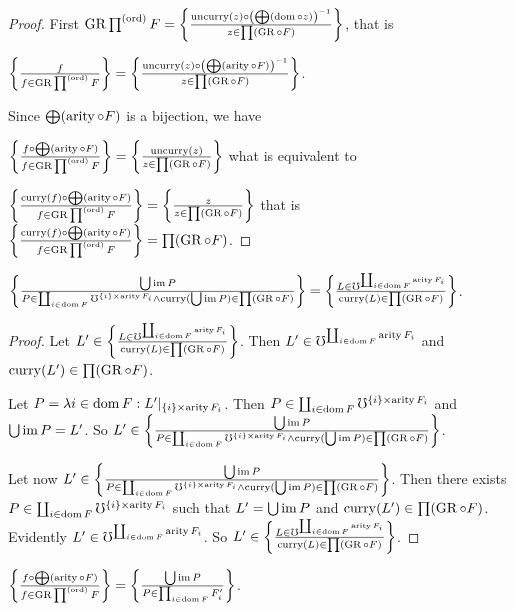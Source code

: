 \begin{proof}
First $\GR\prod^{\mathrm{(ord)}}F=\setcond{\uncurry(z)\circ\left(\bigoplus(\dom\circ z)\right)^{-1}}{z\in\prod(\GR\circ F)}$,
that is

$\setcond f{f\in\GR\prod^{\mathrm{(ord)}}F}=\setcond{\uncurry(z)\circ\left(\bigoplus(\arity\circ F)\right)^{-1}}{z\in\prod(\GR\circ F)}$.

Since $\bigoplus(\arity\circ F)$ is a bijection, we have

$\setcond{f\circ\bigoplus(\arity\circ F)}{f\in\GR\prod^{\mathrm{(ord)}}F}=\setcond{\uncurry(z)}{z\in\prod(\GR\circ F)}$
what is equivalent to

$\setcond{\curry(f)\circ\bigoplus(\arity\circ F)}{f\in\GR\prod^{\mathrm{(ord)}}F}=\setcond z{z\in\prod(\GR\circ F)}$
that is $\setcond{\curry(f)\circ\bigoplus(\arity\circ F)}{f\in\GR\prod^{\mathrm{(ord)}}F}=\prod(\GR\circ F)$.\end{proof}
\begin{lem}
$\setcond{\bigcup\im P}{P\in\coprod_{i\in\dom F}\mho^{\{i\}\times\arity F_{i}}\land\curry(\bigcup\im P)\in\prod(\GR\circ F)}=\setcond{L\in\mho^{\coprod_{i\in\dom F}\arity F_{i}}}{\curry(L)\in\prod(\GR\circ F)}$.\end{lem}
\begin{proof}
Let $L'\in\setcond{L\in\mho^{\coprod_{i\in\dom F}\arity F_{i}}}{\curry(L)\in\prod(\GR\circ F)}$.
Then $L'\in\mho^{\coprod_{i\in\dom F}\arity F_{i}}$ and $\curry(L')\in\prod(\GR\circ F)$.

Let $P=\mylamdba i{\dom F}{L'|_{\{i\}\times\arity F_{i}}}$. Then
$P\in\coprod_{i\in\dom F}\mho^{\{i\}\times\arity F_{i}}$ and $\bigcup\im P=L'$.
So $L'\in\setcond{\bigcup\im P}{P\in\coprod_{i\in\dom F}\mho^{\{i\}\times\arity F_{i}}\land\curry(\bigcup\im P)\in\prod(\GR\circ F)}$.

Let now $L'\in\setcond{\bigcup\im P}{P\in\coprod_{i\in\dom F}\mho^{\{i\}\times\arity F_{i}}\land\curry(\bigcup\im P)\in\prod(\GR\circ F)}$.
Then there exists $P\in\coprod_{i\in\dom F}\mho^{\{i\}\times\arity F_{i}}$
such that $L'=\bigcup\im P$ and $\curry(L')\in\prod(\GR\circ F)$.
Evidently $L'\in\mho^{\coprod_{i\in\dom F}\arity F_{i}}$. So
$L'\in\setcond{L\in\mho^{\coprod_{i\in\dom F}\arity F_{i}}}{\curry(L)\in\prod(\GR\circ F)}$.
\end{proof}
\begin{lem}
$\setcond{f\circ\bigoplus(\arity\circ F)}{f\in\GR\prod^{\mathrm{(ord)}}F}=\setcond{\bigcup\im P}{P\in\prod_{i\in\dom F}F'_{i}}$.\end{lem}
